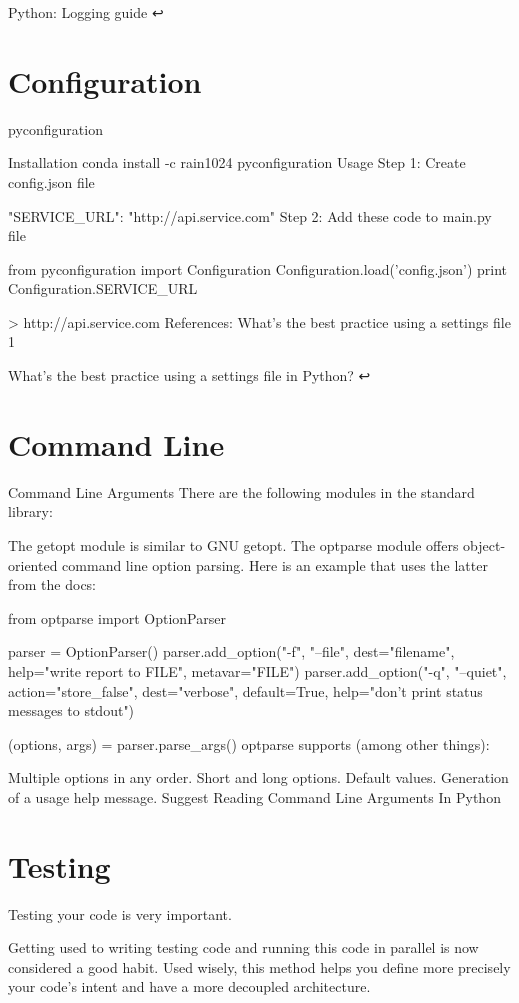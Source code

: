 Python: Logging guide ↩

\section{Configuration}

pyconfiguration

Installation
conda install -c rain1024 pyconfiguration
Usage
Step 1: Create config.json file

{
  "SERVICE_URL": "http://api.service.com"
}
Step 2: Add these code to main.py file

from pyconfiguration import Configuration
Configuration.load('config.json')
print Configuration.SERVICE_URL

> http://api.service.com
References: What's the best practice using a settings file 1

What's the best practice using a settings file in Python? ↩

\section{Command Line}

Command Line Arguments
There are the following modules in the standard library:

The getopt module is similar to GNU getopt.
The optparse module offers object-oriented command line option parsing.
Here is an example that uses the latter from the docs:

from optparse import OptionParser

parser = OptionParser()
parser.add_option("-f", "--file", dest="filename",
                  help="write report to FILE", metavar="FILE")
parser.add_option("-q", "--quiet",
                  action="store_false", dest="verbose", default=True,
                  help="don't print status messages to stdout")

(options, args) = parser.parse_args()
optparse supports (among other things):

Multiple options in any order.
Short and long options.
Default values.
Generation of a usage help message.
Suggest Reading
Command Line Arguments In Python

\section{Testing}

Testing your code is very important.

Getting used to writing testing code and running this code in parallel is now considered a good habit. Used wisely, this method helps you define more precisely your code’s intent and have a more decoupled architecture.


